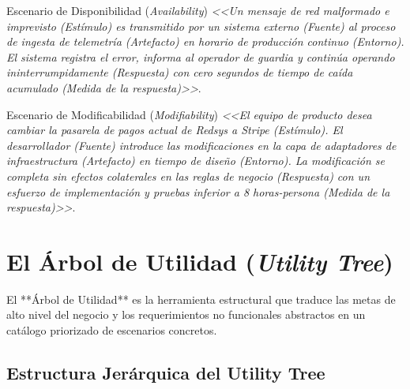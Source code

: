 \begin{ejemplo}{Escenario de Disponibilidad (\emph{Availability})}
\emph{<<Un mensaje de red malformado e imprevisto (Estímulo) es transmitido por un sistema externo (Fuente) al proceso de ingesta de telemetría (Artefacto) en horario de producción continuo (Entorno). El sistema registra el error, informa al operador de guardia y continúa operando ininterrumpidamente (Respuesta) con cero segundos de tiempo de caída acumulado (Medida de la respuesta)>>}.
\end{ejemplo}

\begin{ejemplo}{Escenario de Modificabilidad (\emph{Modifiability})}
\emph{<<El equipo de producto desea cambiar la pasarela de pagos actual de Redsys a Stripe (Estímulo). El desarrollador (Fuente) introduce las modificaciones en la capa de adaptadores de infraestructura (Artefacto) en tiempo de diseño (Entorno). La modificación se completa sin efectos colaterales en las reglas de negocio (Respuesta) con un esfuerzo de implementación y pruebas inferior a 8 horas-persona (Medida de la respuesta)>>}.
\end{ejemplo}

\section{El Árbol de Utilidad (\emph{Utility Tree})}
\label{sec:utility-tree}

El **Árbol de Utilidad** es la herramienta estructural que traduce las metas de alto nivel del negocio y los requerimientos no funcionales abstractos en un catálogo priorizado de escenarios concretos.

\subsection{Estructura Jerárquica del Utility Tree}

